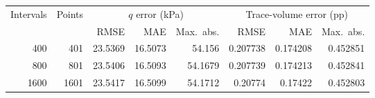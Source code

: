 \begin{tabular}{rr rrr rrr}
\hline
Intervals & Points & \multicolumn{3}{c}{$q$ error (kPa)} & \multicolumn{3}{c}{Trace-volume error (pp)} \\
 & & RMSE & MAE & Max.\ abs. & RMSE & MAE & Max.\ abs. \\
\hline
400 & 401 & 23.5369 & 16.5073 & 54.156 & 0.207738 & 0.174208 & 0.452851 \\
800 & 801 & 23.5406 & 16.5093 & 54.1679 & 0.207739 & 0.174213 & 0.452841 \\
1600 & 1601 & 23.5417 & 16.5099 & 54.1712 & 0.20774 & 0.17422 & 0.452803 \\
\hline
\end{tabular}
